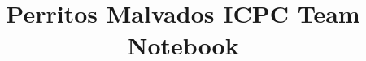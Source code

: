 \documentclass[8pt]{article}
\title{\vspace{-4ex}\Large{Perritos Malvados ICPC Team Notebook}}
\author{}
\date{}
\begin{document}
\begin{landscape}
\setlength{\columnseprule}{0.4pt}
\setlength{\columnsep}{40pt}
\begin{multicols}{2}
\maketitle
\vspace{-13ex}
\tableofcontents
\pagestyle{fancy}



\end{multicols}
\pagebreak
\setlength{\columnseprule}{0pt}
\begin{multicols}{2}

\end{multicols}

\pagebreak



\end{landscape}
\end{document}
